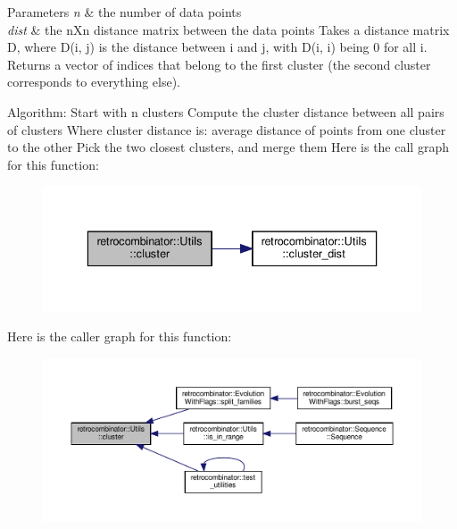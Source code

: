 \begin{DoxyParams}{Parameters}
{\em n} & the number of data points \\
\hline
{\em dist} & the n\+Xn distance matrix between the data points Takes a distance matrix D, where D(i, j) is the distance between i and j, with D(i, i) being 0 for all i. Returns a vector of indices that belong to the first cluster (the second cluster corresponds to everything else).\\
\hline
\end{DoxyParams}
Algorithm\+: Start with n clusters Compute the cluster distance between all pairs of clusters Where cluster distance is\+: average distance of points from one cluster to the other Pick the two closest clusters, and merge them Here is the call graph for this function\+:
\nopagebreak
\begin{figure}[H]
\begin{center}
\leavevmode
\includegraphics[width=336pt]{namespaceretrocombinator_1_1Utils_a03dcc302a7444a0c0897ea1b306e69ef_cgraph}
\end{center}
\end{figure}
Here is the caller graph for this function\+:
\nopagebreak
\begin{figure}[H]
\begin{center}
\leavevmode
\includegraphics[width=350pt]{namespaceretrocombinator_1_1Utils_a03dcc302a7444a0c0897ea1b306e69ef_icgraph}
\end{center}
\end{figure}
\mbox{\label{namespaceretrocombinator_1_1Utils_a75c34419887242476ac8219dfb981459}} 
